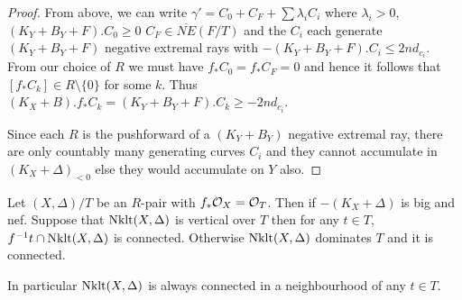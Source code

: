 \begin{proof}
	From above, we can write $\gamma'=C_{0}+C_{F}+ \sum \lambda_{i}C_{i}$ where $\lambda_{i} >0$, $(K_{Y}+B_{Y}+F).C_{0} \geq 0$ $C_{F} \in \overline{NE}(F/T)$ and the $C_{i}$ each generate $(K_{Y}+B_{Y}+F)$ negative extremal rays with $-(K_{Y}+B_{Y}+F).C_{i} \leq 2nd_{c_{i}}$. 	
	From our choice of $R$ we must have $f_{*}C_{0}=f_{*}C_{F}=0$ and hence it follows that $[f_{*}C_{k}] \in R\setminus \{0\}$ for some $k$. Thus $(K_{X}+B).f_{*}C_{k}=(K_{Y}+B_{Y}+F).C_{k} \geq -2nd_{c_{i}}$.
	
	Since each $R$ is the pushforward of a $(K_{Y}+B_{Y})$ negative extremal ray, there are only countably many generating curves $C_{i}$ and they cannot accumulate in $(K_{X}+\Delta)_{< 0}$ else they would accumulate on $Y$ also.
\end{proof}


\begin{theorem}\label{WLC}
	Let $(X,\Delta)/T$ be an $R$-pair with $f_{*}\ox = \ox[T]$. Then if $-(K_{X}+\Delta)$ is big and nef. Suppose that $\textup{Nklt}(X,\Delta)$ is vertical over $T$ then for any $t \in T$, $f^{-1}t \cap \textup{Nklt}(X,\Delta)$ is connected. Otherwise $\textup{Nklt}(X,\Delta)$ dominates $T$ and it is connected. 
	
	In particular $\textup{Nklt}(X,\Delta)$ is always connected in a neighbourhood of any $t\in T$.
\end{theorem}

